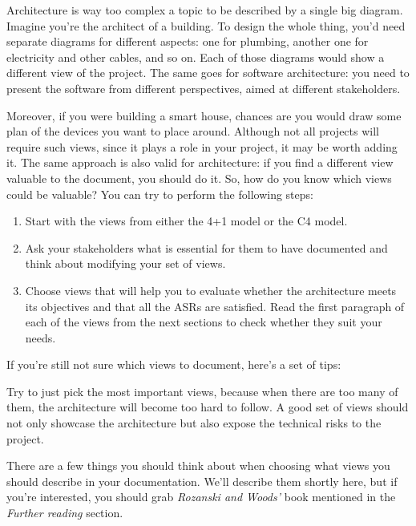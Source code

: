 
Architecture is way too complex a topic to be described by a single big diagram. Imagine you're the architect of a building. To design the whole thing, you'd need separate diagrams for different aspects: one for plumbing, another one for electricity and other cables, and so on. Each of those diagrams would show a different view of the project. The same goes for software architecture: you need to present the software from different perspectives, aimed at different stakeholders.

Moreover, if you were building a smart house, chances are you would draw some plan of the devices you want to place around. Although not all projects will require such views, since it plays a role in your project, it may be worth adding it. The same approach is also valid for architecture: if you find a different view valuable to the document, you should do it. So, how do you know which views could be valuable? You can try to perform the following steps:

\begin{enumerate}
\item
Start with the views from either the 4+1 model or the C4 model.

\item 
Ask your stakeholders what is essential for them to have documented and think about modifying your set of views.

\item
Choose views that will help you to evaluate whether the architecture meets its objectives and that all the ASRs are satisfied. Read the first paragraph of each of the views from the next sections to check whether they suit your needs.
\end{enumerate}

If you're still not sure which views to document, here's a set of tips:

\begin{tcolorbox}[colback=webgreen!5!white,colframe=webgreen!75!black, title=TIP]
\hspace*{0.7cm}Try to just pick the most important views, because when there are too many of them, the architecture will become too hard to follow. A good set of views should not only showcase the architecture but also expose the technical risks to the project.

\end{tcolorbox}

There are a few things you should think about when choosing what views you should describe in your documentation. We'll describe them shortly here, but if you're interested, you should grab \textit{Rozanski and Woods'} book mentioned in the \textit{Further reading} section.

